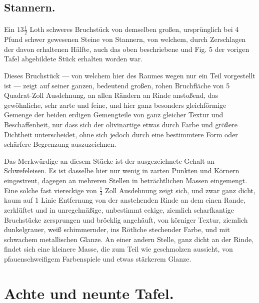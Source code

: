 \documentclass[a4paper, 11pt, oneside, german]{article}
\begin{document}
\subsection{Stannern.}
\paragraph{}
Ein $13\frac{1}{2}$ Loth schweres Bruchstück von demselben großen, ursprünglich bei 4 Pfund schwer gewesenen Steine von Stannern, von welchem, durch Zerschlagen der davon erhaltenen Hälfte, auch das oben beschriebene und Fig. 5 der vorigen Tafel abgebildete Stück erhalten worden war.

Dieses Bruchstück --- von welchem hier des Raumes wegen nur ein Teil vorgestellt ist --- zeigt auf seiner ganzen, bedeutend großen, rohen Bruchfläche von 5 Quadrat-Zoll Ausdehnung, an allen Rändern an Rinde anstoßend, das gewöhnliche, sehr zarte und feine, und hier ganz besonders gleichförmige Gemenge der beiden erdigen Gemengteile von ganz gleicher Textur und Beschaffenheit, nur dass sich der olivinartige etwas durch Farbe und größere Dichtheit unterscheidet, ohne sich jedoch durch eine bestimmtere Form oder schärfere Begrenzung auszuzeichnen.

Das Merkwürdige an diesem Stücke ist der ausgezeichnete Gehalt an Schwefeleisen. Es ist dasselbe hier nur wenig in zarten Punkten und Körnern eingestreut, dagegen an mehreren Stellen in beträchtlichen Massen eingemengt. Eine solche fast viereckige von $\frac{1}{4}$ Zoll Ausdehnung zeigt sich, und zwar ganz dicht, kaum auf 1 Linie Entfernung von der anstehenden Rinde an dem einen Rande, zerklüftet und in unregelmäßige, unbestimmt eckige, ziemlich scharfkantige Bruchstücke zersprungen und bröcklig angehäuft, von körniger Textur, ziemlich dunkelgrauer, weiß schimmernder, ins Rötliche stechender Farbe, und mit schwachem metallischen Glanze. An einer andern Stelle, ganz dicht an der Rinde, findet sich eine kleinere Masse, die zum Teil wie geschmolzen aussieht, von pfauenschweifigem Farbenspiele und etwas stärkerem Glanze.
\clearpage
\section{Achte und neunte Tafel.}
\end{document}
